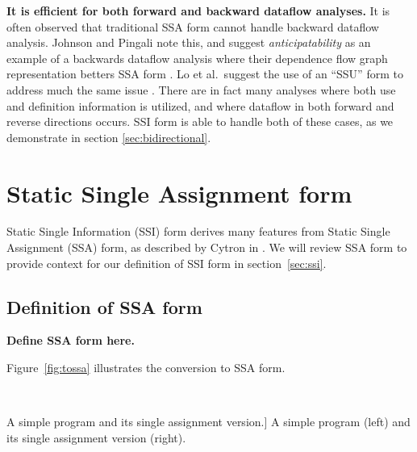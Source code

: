 \documentclass[12pt,titlepage,twoside]{article}
\let\oldsection\section
\renewcommand{\section}{\setcounter{figure}{0}\setcounter{table}{0}\oldsection}
\begin{document}
\textbf{It is efficient for both forward and backward dataflow analyses.}
It is often observed that traditional SSA form cannot handle backward
dataflow analysis.  Johnson and Pingali note this, and suggest
\emph{anticipatability} as an example of a backwards dataflow analysis
where their dependence flow graph representation betters SSA form
\cite{johnson93:dfg}. Lo et al.\ suggest the use of an ``SSU'' form to
address much the same issue \cite{lo98:ssu}.  There are in fact many
analyses where both use and definition information is utilized, and
where dataflow in both forward and reverse directions occurs.  SSI
form is able to handle both of these cases, as we demonstrate in
section \ref{sec:bidirectional}.

\section{Static Single Assignment form}\label{sec:ssa}
Static Single Information (SSI) form derives many features from Static
Single Assignment (SSA) form, as described by Cytron in
\cite{cytron89:ssa}.  We will review SSA form to provide context for
our definition of SSI form in section~\ref{sec:ssi}.

\subsection{Definition of SSA form}

\textbf{Define SSA form here.}

Figure~\vref{fig:tossa} illustrates the conversion to SSA form.
\begin{myfigure}
\begin{center}
 \vline\ 
\end{center}
\caption
[A simple program and its single assignment version.]
{A simple program (left) and its single assignment version (right).
\label{fig:tossa}}
\end{myfigure}
\end{document}
